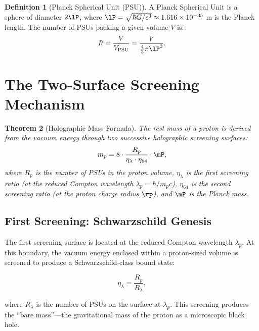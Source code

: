 \documentclass[12pt, a4paper]{article}
\theoremstyle{plain}
\newtheorem{theorem}{Theorem}[section]
\theoremstyle{definition}
\newtheorem{definition}[theorem]{Definition}
\begin{document}
\begin{definition}[Planck Spherical Unit (PSU)]\label{def:psu}
  A Planck Spherical Unit is a sphere of diameter $2\lP$, where
  $\lP = \sqrt{\hbar G / c^3} \approx 1.616 \times 10^{-35}$ m is the
  Planck length. The number of PSUs packing a given volume $V$ is:
  \begin{equation}
    R = \frac{V}{V_{\text{PSU}}} = \frac{V}{\frac{4}{3}\pi \lP^3}.
  \end{equation}
\end{definition}

\section{The Two-Surface Screening Mechanism}\label{sec:screening}

\begin{theorem}[Holographic Mass Formula]\label{thm:holographic_mass}
  The rest mass of a proton is derived from the vacuum energy through two
  successive holographic screening surfaces:
  \begin{equation}\label{eq:mass}
    m_p = 8 \cdot \frac{R_p}{\eta_\lambda \cdot \eta_{64}} \cdot \mP,
  \end{equation}
  where $R_p$ is the number of PSUs in the proton volume, $\eta_\lambda$
  is the first screening ratio (at the reduced Compton wavelength
  $\lambda_p = \hbar / m_p c$), $\eta_{64}$ is the second screening ratio
  (at the proton charge radius $\rp$), and $\mP$ is the Planck mass.
\end{theorem}

\subsection{First Screening: Schwarzschild Genesis}

The first screening surface is located at the reduced Compton wavelength
$\lambda_p$. At this boundary, the vacuum energy enclosed within a proton-sized
volume is screened to produce a Schwarzschild-class bound state:

\begin{equation}
  \eta_\lambda = \frac{R_p}{R_{\lambda}},
\end{equation}

where $R_\lambda$ is the number of PSUs on the surface at $\lambda_p$.
This screening produces the ``bare mass''---the gravitational mass of the
proton as a microscopic black hole.
\end{document}
